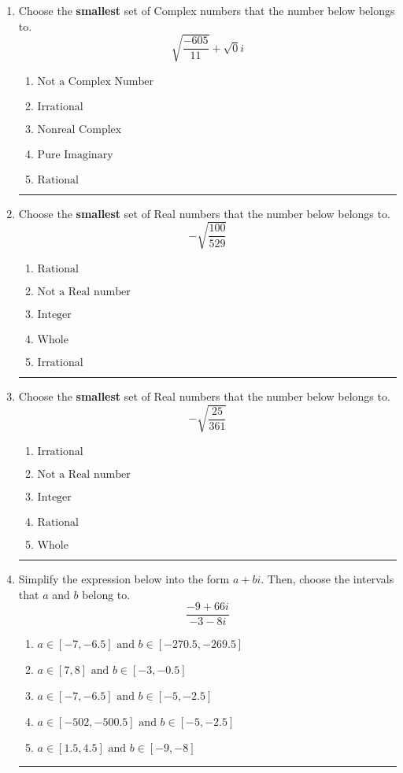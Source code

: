 \documentclass[14pt]{extbook}
\newcommand{\litem}[1]{\item#1\hspace*{-1cm}\rule{\textwidth}{0.4pt}}
\begin{document}
\begin{enumerate}
{\begin{enumerate}[label=\Alph*.]
\end{enumerate} }
\litem{
Choose the \textbf{smallest} set of Complex numbers that the number below belongs to.\[ \sqrt{\frac{-605}{11}}+\sqrt{0}i \]\begin{enumerate}[label=\Alph*.]
\item \( \text{Not a Complex Number} \)
\item \( \text{Irrational} \)
\item \( \text{Nonreal Complex} \)
\item \( \text{Pure Imaginary} \)
\item \( \text{Rational} \)

\end{enumerate} }
\litem{
Choose the \textbf{smallest} set of Real numbers that the number below belongs to.\[ -\sqrt{\frac{100}{529}} \]\begin{enumerate}[label=\Alph*.]
\item \( \text{Rational} \)
\item \( \text{Not a Real number} \)
\item \( \text{Integer} \)
\item \( \text{Whole} \)
\item \( \text{Irrational} \)

\end{enumerate} }
\litem{
Choose the \textbf{smallest} set of Real numbers that the number below belongs to.\[ -\sqrt{\frac{25}{361}} \]\begin{enumerate}[label=\Alph*.]
\item \( \text{Irrational} \)
\item \( \text{Not a Real number} \)
\item \( \text{Integer} \)
\item \( \text{Rational} \)
\item \( \text{Whole} \)

\end{enumerate} }
\litem{
Simplify the expression below into the form $a+bi$. Then, choose the intervals that $a$ and $b$ belong to.\[ \frac{-9 + 66 i}{-3 - 8 i} \]\begin{enumerate}[label=\Alph*.]
\item \( a \in [-7, -6.5] \text{ and } b \in [-270.5, -269.5] \)
\item \( a \in [7, 8] \text{ and } b \in [-3, -0.5] \)
\item \( a \in [-7, -6.5] \text{ and } b \in [-5, -2.5] \)
\item \( a \in [-502, -500.5] \text{ and } b \in [-5, -2.5] \)
\item \( a \in [1.5, 4.5] \text{ and } b \in [-9, -8] \)


\end{enumerate}}
\end{enumerate}
\end{document}
